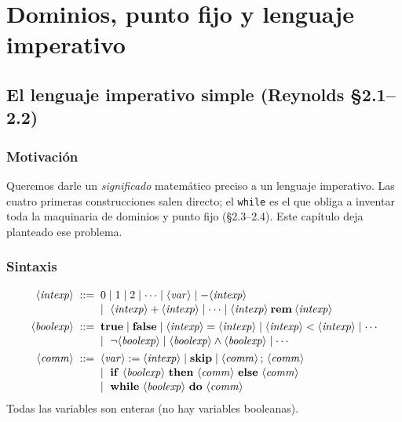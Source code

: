 \chapter{Dominios, punto fijo y lenguaje imperativo}


\section{El lenguaje imperativo simple (Reynolds §2.1--2.2)}

\subsection*{Motivación}
Queremos darle un \emph{significado} matemático preciso a un lenguaje
imperativo. Las cuatro primeras construcciones salen directo; el \texttt{while}
es el que obliga a inventar toda la maquinaria de dominios y punto fijo
(§2.3--2.4). Este capítulo deja planteado ese problema.

\subsection*{Sintaxis}
\[
\begin{array}{r@{\;\;}c@{\;\;}l}
\langle\mathit{intexp}\rangle &::=&
   0 \mid 1 \mid 2 \mid \cdots \mid \langle\mathit{var}\rangle \mid -\langle\mathit{intexp}\rangle \\[1pt]
&& \mid\ \langle\mathit{intexp}\rangle + \langle\mathit{intexp}\rangle \mid \cdots
   \mid \langle\mathit{intexp}\rangle \mathbin{\mathbf{rem}} \langle\mathit{intexp}\rangle \\[4pt]
\langle\mathit{boolexp}\rangle &::=&
   \mathbf{true} \mid \mathbf{false}
   \mid \langle\mathit{intexp}\rangle = \langle\mathit{intexp}\rangle
   \mid \langle\mathit{intexp}\rangle < \langle\mathit{intexp}\rangle \mid \cdots \\[1pt]
&& \mid\ \neg\langle\mathit{boolexp}\rangle
   \mid \langle\mathit{boolexp}\rangle \wedge \langle\mathit{boolexp}\rangle \mid \cdots \\[4pt]
\langle\mathit{comm}\rangle &::=&
   \langle\mathit{var}\rangle := \langle\mathit{intexp}\rangle
   \mid \mathbf{skip}
   \mid \langle\mathit{comm}\rangle\,;\,\langle\mathit{comm}\rangle \\[1pt]
&& \mid\ \mathbf{if}\ \langle\mathit{boolexp}\rangle\ \mathbf{then}\ \langle\mathit{comm}\rangle\ \mathbf{else}\ \langle\mathit{comm}\rangle \\[1pt]
&& \mid\ \mathbf{while}\ \langle\mathit{boolexp}\rangle\ \mathbf{do}\ \langle\mathit{comm}\rangle
\end{array}
\]
Todas las variables son enteras (no hay variables booleanas).

